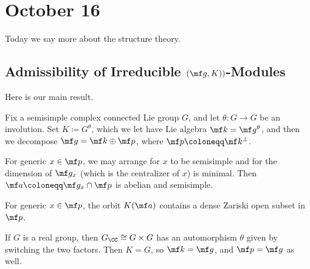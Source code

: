 \documentclass[../notes.tex]{subfiles}
\begin{document}
\section{October 16}
Today we say more about the structure theory.

\subsection{Admissibility of Irreducible \texorpdfstring{$(\mf g,K))$}{ (g, K)}-Modules}
Here is our main result.
\begin{proposition} \label{prop:generic-split-element}
	Fix a semisimple complex connected Lie group $G$, and let $\theta\colon G\to G$ be an involution. Set $K\coloneqq G^\theta$, which we let have Lie algebra $\mf k=\mf g^\theta$, and then we decompose $\mf g=\mf k\oplus\mf p$, where $\mf p\coloneqq\mf k^\perp$.
	\begin{listalph}
		\item For generic $x\in\mf p$, we may arrange for $x$ to be semisimple and for the dimension of $\mf g_x$ (which is the centralizer of $x$) is minimal. Then $\mf a\coloneqq\mf g_x\cap\mf p$ is abelian and semisimple.
		\item For generic $x\in\mf p$, the orbit $K(\mf a)$ contains a dense Zariski open subset in $\mf p$.
	\end{listalph}
\end{proposition}
\begin{example}
	If $G$ is a real group, then $G_\CC\cong G\times G$ has an automorphism $\theta$ given by switching the two factors. Then $K=G$, so $\mf k=\mf g$, and $\mf p=\mf g$ as well.
\end{example}
\end{document}
